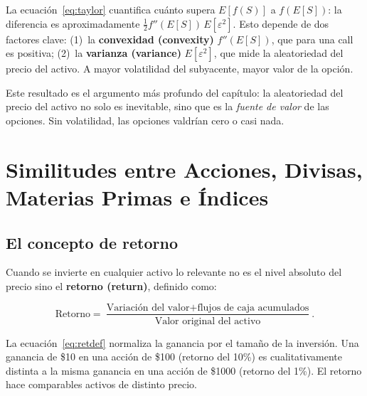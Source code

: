 \documentclass[12pt]{article}
\begin{document}
\begin{intuicionmat}
La ecuaci\'on~\eqref{eq:taylor} cuantifica cu\'anto supera $E[f(S)]$ a $f(E[S])$:
la diferencia es aproximadamente $\frac{1}{2}f''(E[S])\,E[\varepsilon^2]$.
Esto depende de dos factores clave:
(1)~la \textbf{convexidad (convexity)} $f''(E[S])$, que para una call es positiva;
(2)~la \textbf{varianza (variance)} $E[\varepsilon^2]$, que mide la aleatoriedad
del precio del activo. A mayor volatilidad del subyacente, mayor valor de la opci\'on.
\end{intuicionmat}

\begin{intuicion}
Este resultado es el argumento m\'as profundo del cap\'itulo: la aleatoriedad del
precio del activo no solo es inevitable, sino que es la \emph{fuente de valor} de
las opciones. Sin volatilidad, las opciones valdr\'ian cero o casi nada.
\end{intuicion}

\section{Similitudes entre Acciones, Divisas, Materias Primas e \'Indices}

\subsection{El concepto de retorno}

Cuando se invierte en cualquier activo lo relevante no es el nivel absoluto del precio
sino el \textbf{retorno (return)}, definido como:

\begin{equation}
  \text{Retorno} = \frac{\text{Variaci\'on del valor} + \text{flujos de caja acumulados}}
                        {\text{Valor original del activo}}.
  \label{eq:retdef}
\end{equation}

\begin{intuicionmat}
La ecuaci\'on~\eqref{eq:retdef} normaliza la ganancia por el tama\~no de la
inversi\'on. Una ganancia de \$10 en una acci\'on de \$100 (retorno del 10\%)
es cualitativamente distinta a la misma ganancia en una acci\'on de \$1000
(retorno del 1\%). El retorno hace comparables activos de distinto precio.
\end{intuicionmat}
\end{document}

